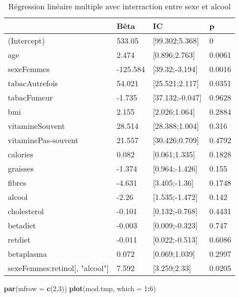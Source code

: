 \documentclass[]{article}
\newenvironment{Shaded}{\begin{snugshade}}{\end{snugshade}}
\newcommand{\KeywordTok}[1]{\textcolor[rgb]{0.13,0.29,0.53}{\textbf{#1}}}
\newcommand{\DataTypeTok}[1]{\textcolor[rgb]{0.13,0.29,0.53}{#1}}
\newcommand{\DecValTok}[1]{\textcolor[rgb]{0.00,0.00,0.81}{#1}}
\newcommand{\OperatorTok}[1]{\textcolor[rgb]{0.81,0.36,0.00}{\textbf{#1}}}
\newcommand{\NormalTok}[1]{#1}
\begin{document}
\begin{table}

\caption{\label{tab:unnamed-chunk-66}Régression linéaire multiple avec interraction entre sexe et alcool}
\centering
\begin{tabular}[t]{l|l|l|l}
\hline
  & Bêta & IC & p\\
\hline
\rowcolor[HTML]{BBD2E1}  (Intercept) & 533.05 & [99.302;5.368] & 0\\
\hline
age & 2.474 & [0.896;2.763] & 0.0061\\
\hline
\rowcolor[HTML]{BBD2E1}  sexeFemmes & -125.584 & [39.32;-3.194] & 0.0016\\
\hline
tabacAutrefois & 54.021 & [25.521;2.117] & 0.0351\\
\hline
\rowcolor[HTML]{BBD2E1}  tabacFumeur & -1.735 & [37.132;-0.047] & 0.9628\\
\hline
bmi & 2.155 & [2.026;1.064] & 0.2884\\
\hline
\rowcolor[HTML]{BBD2E1}  vitamineSouvent & 28.514 & [28.388;1.004] & 0.316\\
\hline
vitaminePas-souvent & 21.557 & [30.426;0.709] & 0.4792\\
\hline
\rowcolor[HTML]{BBD2E1}  calories & 0.082 & [0.061;1.335] & 0.1828\\
\hline
graisses & -1.374 & [0.964;-1.426] & 0.155\\
\hline
\rowcolor[HTML]{BBD2E1}  fibres & -4.631 & [3.405;-1.36] & 0.1748\\
\hline
alcool & -2.26 & [1.535;-1.472] & 0.142\\
\hline
\rowcolor[HTML]{BBD2E1}  cholesterol & -0.101 & [0.132;-0.768] & 0.4431\\
\hline
betadiet & -0.003 & [0.009;-0.323] & 0.747\\
\hline
\rowcolor[HTML]{BBD2E1}  retdiet & -0.011 & [0.022;-0.513] & 0.6086\\
\hline
betaplasma & 0.072 & [0.069;1.039] & 0.2997\\
\hline
\rowcolor[HTML]{BBD2E1}  sexeFemmes:retinol[, "alcool"] & 7.592 & [3.259;2.33] & 0.0205\\
\hline
\end{tabular}
\end{table}

\begin{Shaded}
\begin{Highlighting}[]
\KeywordTok{par}\NormalTok{(}\DataTypeTok{mfrow =} \KeywordTok{c}\NormalTok{(}\DecValTok{2}\NormalTok{,}\DecValTok{3}\NormalTok{))}
\KeywordTok{plot}\NormalTok{(mod.tmp, }\DataTypeTok{which =} \DecValTok{1}\OperatorTok{:}\DecValTok{6}\NormalTok{)}
\end{Highlighting}
\end{Shaded}
\end{document}
